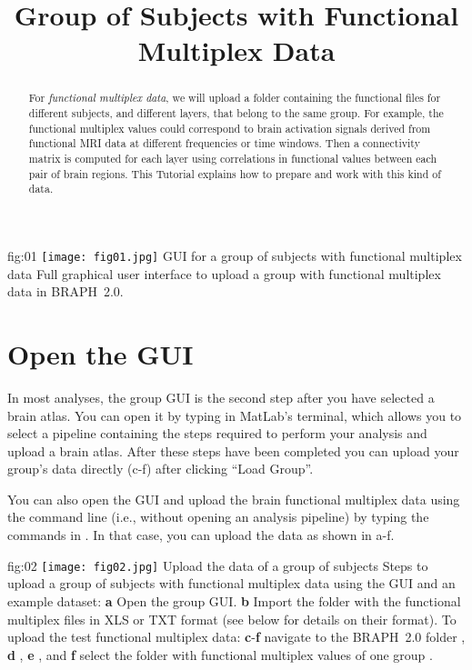 \documentclass[justified]{tufte-handout}
\title{Group of Subjects with Functional Multiplex Data}
\begin{document}
\maketitle

\begin{abstract}
\noindent
For \emph{functional multiplex data}, we will upload a folder containing the functional files for different subjects, and different layers, that belong to the same group. For example, the functional multiplex values could correspond to brain activation signals derived from functional MRI data at different frequencies or time windows.  Then a connectivity matrix is computed for each layer using correlations in functional values between each pair of brain regions. This Tutorial explains how to prepare and work with this kind of data.
\end{abstract}

\tableofcontents

	{fig:01}
	{\texttt{[image: fig01.jpg]}}
	{GUI for a group of subjects with functional multiplex data}
	{
	Full graphical user interface to upload a group with functional multiplex data in BRAPH~2.0. 
	}

\clearpage
\section{Open the GUI}

In most analyses, the group GUI is the second step after you have selected a brain atlas. You can open it by typing  in MatLab's terminal, which allows you to select a pipeline containing the steps required to perform your analysis and upload a brain atlas. After these steps have been completed you can upload your group's data directly (c-f) after clicking ``Load Group''. 

You can also open the GUI and upload the brain functional multiplex data using the command line (i.e., without opening an analysis pipeline) by typing the commands in . In that case, you can upload the data as shown in a-f.

	{fig:02}
	{
	\texttt{[image: fig02.jpg]}
	}
	{Upload the data of a group of subjects}
	{
	Steps to upload a group of subjects with functional multiplex data using the GUI and an example dataset: 
	{\bf a} Open the group GUI.
	{\bf b} Import the folder with the functional multiplex files in XLS or TXT format (see below for details on their format).
	To upload the test functional multiplex data:
	{\bf c}-{\bf f} navigate to the BRAPH~2.0 folder , {\bf d} ,  {\bf e} , and {\bf f} select the folder with functional multiplex values of one group .
	}
\end{document}
